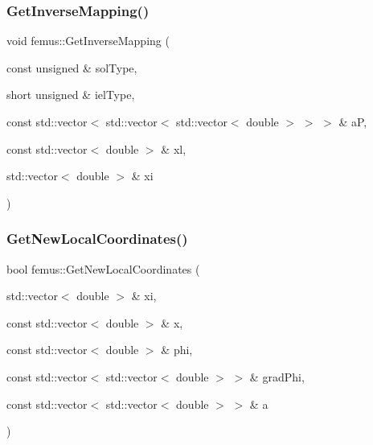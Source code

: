 \subsubsection{\texorpdfstring{Get\+Inverse\+Mapping()}{GetInverseMapping()}}
{\footnotesize\ttfamily void femus\+::\+Get\+Inverse\+Mapping (\begin{DoxyParamCaption}\item[{const unsigned \&}]{sol\+Type,  }\item[{short unsigned \&}]{iel\+Type,  }\item[{const std\+::vector$<$ std\+::vector$<$ std\+::vector$<$ double $>$ $>$ $>$ \&}]{aP,  }\item[{const std\+::vector$<$ double $>$ \&}]{xl,  }\item[{std\+::vector$<$ double $>$ \&}]{xi }\end{DoxyParamCaption})}

\mbox{\label{namespacefemus_a2be78fad3a0b3413f8e22883150153c9}} 
\subsubsection{\texorpdfstring{Get\+New\+Local\+Coordinates()}{GetNewLocalCoordinates()}}
{\footnotesize\ttfamily bool femus\+::\+Get\+New\+Local\+Coordinates (\begin{DoxyParamCaption}\item[{std\+::vector$<$ double $>$ \&}]{xi,  }\item[{const std\+::vector$<$ double $>$ \&}]{x,  }\item[{const std\+::vector$<$ double $>$ \&}]{phi,  }\item[{const std\+::vector$<$ std\+::vector$<$ double $>$ $>$ \&}]{grad\+Phi,  }\item[{const std\+::vector$<$ std\+::vector$<$ double $>$ $>$ \&}]{a }\end{DoxyParamCaption})}

\mbox{\label{namespacefemus_a695934883c44cf05935b730e622e0bf6}} 
